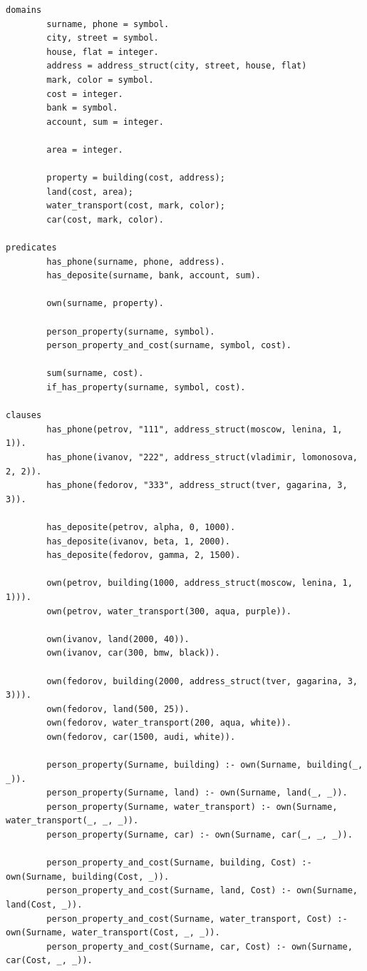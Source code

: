 \documentclass[12pt,a4paper]{scrreprt}
\begin{document}
\clearpage
\begin{lstlisting}
domains
		surname, phone = symbol.
		city, street = symbol.
		house, flat = integer.
		address = address_struct(city, street, house, flat)
		mark, color = symbol.
		cost = integer.
		bank = symbol.
		account, sum = integer.
		
		area = integer.
		
		property = building(cost, address); 
		land(cost, area); 
		water_transport(cost, mark, color); 
		car(cost, mark, color).

predicates
		has_phone(surname, phone, address).
		has_deposite(surname, bank, account, sum).
		
		own(surname, property).
		
		person_property(surname, symbol).
		person_property_and_cost(surname, symbol, cost).
		
		sum(surname, cost).
		if_has_property(surname, symbol, cost).

clauses
		has_phone(petrov, "111", address_struct(moscow, lenina, 1, 1)).
		has_phone(ivanov, "222", address_struct(vladimir, lomonosova, 2, 2)).
		has_phone(fedorov, "333", address_struct(tver, gagarina, 3, 3)).
		
		has_deposite(petrov, alpha, 0, 1000).
		has_deposite(ivanov, beta, 1, 2000).
		has_deposite(fedorov, gamma, 2, 1500).
		
		own(petrov, building(1000, address_struct(moscow, lenina, 1, 1))).
		own(petrov, water_transport(300, aqua, purple)).
		
		own(ivanov, land(2000, 40)).
		own(ivanov, car(300, bmw, black)).
		
		own(fedorov, building(2000, address_struct(tver, gagarina, 3, 3))).
		own(fedorov, land(500, 25)).
		own(fedorov, water_transport(200, aqua, white)).
		own(fedorov, car(1500, audi, white)).
		
		person_property(Surname, building) :- own(Surname, building(_, _)).
		person_property(Surname, land) :- own(Surname, land(_, _)).
		person_property(Surname, water_transport) :- own(Surname, water_transport(_, _, _)).
		person_property(Surname, car) :- own(Surname, car(_, _, _)).
		
		person_property_and_cost(Surname, building, Cost) :- own(Surname, building(Cost, _)).
		person_property_and_cost(Surname, land, Cost) :- own(Surname, land(Cost, _)).
		person_property_and_cost(Surname, water_transport, Cost) :- own(Surname, water_transport(Cost, _, _)).
		person_property_and_cost(Surname, car, Cost) :- own(Surname, car(Cost, _, _)).
		

\end{lstlisting}
\end{document}
